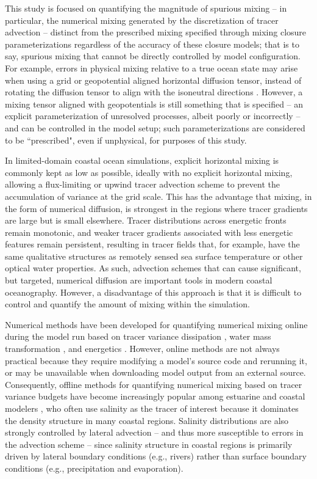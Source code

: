 This study is focused on quantifying the magnitude of spurious mixing -- in particular, the numerical mixing generated by the discretization of tracer advection -- distinct from the prescribed mixing specified through mixing closure parameterizations regardless of the accuracy of these closure models; that is to say, spurious mixing that cannot be directly controlled by model configuration. For example, errors in physical mixing relative to a true ocean state may arise when using a grid or geopotential aligned horizontal diffusion tensor, instead of rotating the diffusion tensor to align with the isoneutral directions \citep{griffies1998isoneutral, redi1982oceanic}. However, a mixing tensor aligned with geopotentials is still something that is specified --  an explicit parameterization of unresolved processes, albeit poorly or incorrectly -- and can be controlled in the model setup; such parameterizations are considered to be ``prescribed", even if unphysical, for purposes of this study.

In limited-domain coastal ocean simulations, explicit horizontal mixing is commonly kept as low as possible, ideally with no explicit horizontal mixing, allowing a flux-limiting \citep{Smolarkiewicz_1998} or upwind \citep{shchepetkin1998quasi} tracer advection scheme to prevent the accumulation of variance at the grid scale. This has the advantage that mixing, in the form of numerical diffusion, is strongest in the regions where tracer gradients are large but is small elsewhere. Tracer distributions across energetic fronts remain monotonic, and weaker tracer gradients associated with less energetic features remain persistent, resulting in tracer fields that, for example, have the same qualitative structures as remotely sensed sea surface temperature or other optical water properties. As such, advection schemes that can cause significant, but targeted, numerical diffusion are important tools in modern coastal oceanography. However, a disadvantage of this approach is that it is difficult to control and quantify the amount of mixing within the simulation.

Numerical methods have been developed for quantifying numerical mixing online during the model run based on tracer variance dissipation \citep{Burchard_2008, Klingbeil_2014}, water mass transformation \citep{Holmes_2021, lee2002spurious, megann2018estimating}, and energetics \citep{Ilicak_2012, Petersen_2015, winters1995available}. However, online methods are not always practical because they require modifying a model's source code and rerunning it, or may be unavailable when downloading model output from an external source. Consequently, offline methods for quantifying numerical mixing based on tracer variance budgets have become increasingly popular among estuarine and coastal modelers \citep{Li_2018, MacCready_2018, Wang_2017, Wang_2021}, who often use salinity as the tracer of interest because it dominates the density structure in many coastal regions. Salinity distributions are also strongly controlled by lateral advection -- and thus more susceptible to errors in the advection scheme -- since salinity structure in coastal regions is primarily driven by lateral boundary conditions (e.g., rivers) rather than surface boundary conditions (e.g., precipitation and evaporation). 

